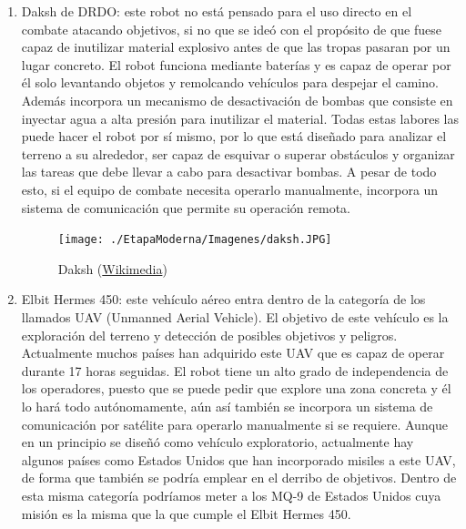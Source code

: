 \begin{enumerate}
  \item Daksh de DRDO: este robot no está pensado para el uso directo en el combate atacando objetivos, si no que se ideó con el propósito de que fuese capaz de inutilizar material explosivo antes de que las tropas pasaran por un lugar concreto. El robot funciona mediante baterías y es capaz de operar por él solo levantando objetos y remolcando vehículos para despejar el camino. Además incorpora un mecanismo de desactivación de bombas que consiste en inyectar agua a alta presión para inutilizar el material. Todas estas labores las puede hacer el robot por sí mismo, por lo que está diseñado para analizar el terreno a su alrededor, ser capaz de esquivar o superar obstáculos y organizar las tareas que debe llevar a cabo para desactivar bombas. A pesar de todo esto, si el equipo de combate necesita operarlo manualmente, incorpora un sistema de comunicación que permite su operación remota.
  \begin{figure}[!h]
  	\centering
  	\texttt{[image: ./EtapaModerna/Imagenes/daksh.JPG]}
  	\caption{Daksh (\href{https://commons.wikimedia.org/wiki/File:Daksh_-_Remotely_Operated_Vehicle_-_DRDO_-_Pride_of_India_-_Exhibition_-_100th_Indian_Science_Congress_-_Kolkata_2013-01-03_2570.JPG}{Wikimedia})}
  	\label{fig:daksh}
  \end{figure}
  \newpage
  \item Elbit Hermes 450: este vehículo aéreo entra dentro de la categoría de los llamados UAV (Unmanned Aerial Vehicle). El objetivo de este vehículo es la exploración del terreno y detección de posibles objetivos y peligros. Actualmente muchos países han adquirido este UAV que es capaz de operar durante 17 horas seguidas. El robot tiene un alto grado de independencia de los operadores, puesto que se puede pedir que explore una zona concreta y él lo hará todo autónomamente, aún así también se incorpora un sistema de comunicación por satélite para operarlo manualmente si se requiere. Aunque en un principio se diseñó como vehículo exploratorio, actualmente hay algunos países como Estados Unidos que han incorporado misiles a este UAV, de forma que también se podría emplear en el derribo de objetivos. Dentro de esta misma categoría podríamos meter a los MQ-9 de Estados Unidos cuya misión es la misma que la que cumple el Elbit Hermes 450.
  \begin{figure}[!h]
  	\centering

\end{figure}
\end{enumerate}
